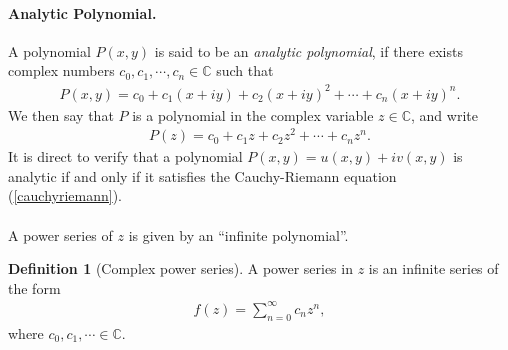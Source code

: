 \documentclass{article}
\numberwithin{equation}{section}
\newcommand{\bbC}{\mathbb{C}}
\theoremstyle{plain}
\theoremstyle{definition}
\newtheorem{definition}[theorem]{Definition}
\begin{document}
\paragraph{Analytic Polynomial.} A polynomial $P(x,y)$ is said to be an \textit{analytic polynomial}, if there exists complex numbers $c_0,c_1,\cdots,c_n\in\bbC$ such that
\begin{align*}
	P(x,y)=c_0+c_1(x+iy)+c_2(x+iy)^2 +\cdots + c_n(x+iy)^n.
\end{align*} 
We then say that $P$ is a polynomial in the complex variable $z\in\bbC$, and write
\begin{align*}
	P(z)=c_0+c_1z+c_2z^2+\cdots+c_nz^n.
\end{align*}
It is direct to verify that a polynomial $P(x,y)=u(x,y)+iv(x,y)$ is analytic if and only if it satisfies the Cauchy-Riemann equation (\ref{cauchyriemann}).

\paragraph{} A power series of $z$ is given by an ``infinite polynomial''.
\begin{definition}[Complex power series]
A power series in $z$ is an infinite series of the form
\begin{align*}
	f(z)=\sum_{n=0}^\infty c_nz^n,
\end{align*}
where $c_0,c_1,\cdots\in\bbC$.
\end{definition}
\end{document}
